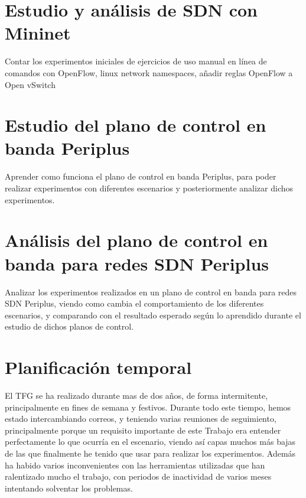 \documentclass[a4paper, 12pt]{book}
\begin{document}
	\section{Estudio y análisis de SDN con Mininet} %
	\label{sec:objetivo-mininet} %
	
	Contar los experimentos iniciales de ejercicios de uso manual en línea de comandos con OpenFlow, linux network namespaces, añadir reglas OpenFlow a Open vSwitch
	
	
	\section{Estudio del plano de control en banda Periplus}
	\label{sec:objetivos-periplus}
	
	Aprender como funciona el plano de control en banda Periplus, para poder realizar experimentos con diferentes escenarios y posteriormente analizar dichos experimentos.
	
	\section{Análisis del plano de control en banda para redes SDN Periplus}
	
	Analizar los experimentos realizados en un plano de control en banda para redes SDN Periplus, viendo como cambia el comportamiento de los diferentes escenarios, y comparando con el resultado esperado según lo aprendido durante el estudio de dichos planos de control.
	\label{sec:objetivos-analisis-periplus}
	

	
	\cleardoublepage
	\section{Planificación temporal}
	\label{sec:planificacion-temporal}
	
	El TFG se ha realizado durante mas de dos años, de forma intermitente, principalmente en fines de semana y festivos. Durante todo este tiempo, hemos estado intercambiando correos, y teniendo varias reuniones de seguimiento, principalmente porque un requisito importante de este Trabajo era entender perfectamente lo que ocurría en el escenario, viendo así capas muchos más bajas de las que finalmente he tenido que usar para realizar los experimentos.
	Además ha habido varios inconvenientes con las herramientas utilizadas que han ralentizado mucho el trabajo, con periodos de inactividad de varios meses intentando solventar los problemas.
	
\end{document}
